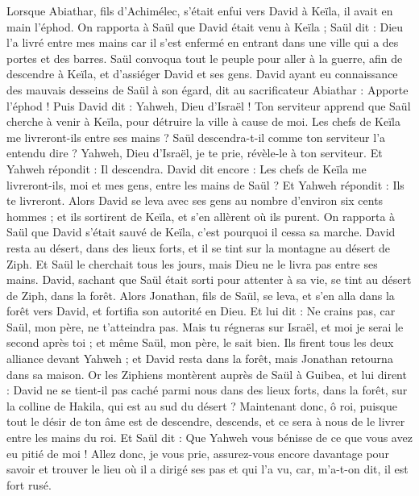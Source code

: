 \begin{multicols}{2}
Lorsque Abiathar, fils d'Achimélec, s'était enfui vers David à Keïla, il avait en main l'éphod.
On rapporta à Saül que David était venu à Keïla ; Saül dit : Dieu l'a livré entre mes mains car il s'est enfermé en entrant dans une ville qui a des portes et des barres.
Saül convoqua tout le peuple pour aller à la guerre, afin de descendre à Keïla, et d'assiéger David et ses gens.
David ayant eu connaissance des mauvais desseins de Saül à son égard, dit au sacrificateur Abiathar : Apporte l'éphod !
Puis David dit : Yahweh, Dieu d'Israël ! Ton serviteur apprend que Saül cherche à venir à Keïla, pour détruire la ville à cause de moi.
Les chefs de Keïla me livreront-ils entre ses mains ? Saül descendra-t-il comme ton serviteur l'a entendu dire ? Yahweh, Dieu d'Israël, je te prie, révèle-le à ton serviteur. Et Yahweh répondit : Il descendra.
David dit encore : Les chefs de Keïla me livreront-ils, moi et mes gens, entre les mains de Saül ? Et Yahweh répondit : Ils te livreront.
Alors David se leva avec ses gens au nombre d'environ six cents hommes ; et ils sortirent de Keïla, et s'en allèrent où ils purent. On rapporta à Saül que David s'était sauvé de Keïla, c'est pourquoi il cessa sa marche.
David resta au désert, dans des lieux forts, et il se tint sur la montagne au désert de Ziph. Et Saül le cherchait tous les jours, mais Dieu ne le livra pas entre ses mains.
David, sachant que Saül était sorti pour attenter à sa vie, se tint au désert de Ziph, dans la forêt.
Alors Jonathan, fils de Saül, se leva, et s'en alla dans la forêt vers David, et fortifia son autorité en Dieu.
Et lui dit : Ne crains pas, car Saül, mon père, ne t'atteindra pas. Mais tu régneras sur Israël, et moi je serai le second après toi ; et même Saül, mon père, le sait bien.
Ils firent tous les deux alliance devant Yahweh ; et David resta dans la forêt, mais Jonathan retourna dans sa maison.
Or les Ziphiens montèrent auprès de Saül à Guibea, et lui dirent : David ne se tient-il pas caché parmi nous dans des lieux forts, dans la forêt, sur la colline de Hakila, qui est au sud du désert ?
Maintenant donc, ô roi, puisque tout le désir de ton âme est de descendre, descends, et ce sera à nous de le livrer entre les mains du roi.
Et Saül dit : Que Yahweh vous bénisse de ce que vous avez eu pitié de moi !
Allez donc, je vous prie, assurez-vous encore davantage pour savoir et trouver le lieu où il a dirigé ses pas et qui l'a vu, car, m'a-t-on dit, il est fort rusé.

\end{multicols}
